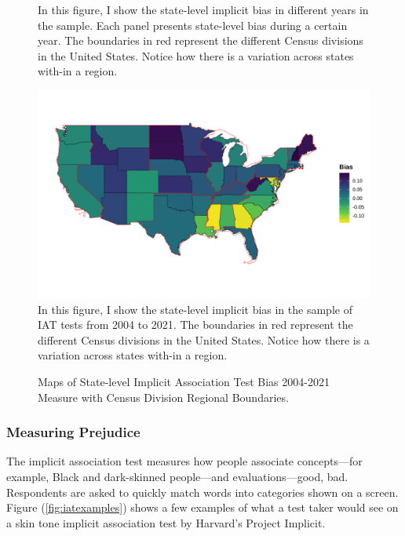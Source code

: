 \documentclass[12pt, fullpage]{article}
\newcommand{\note}[1]{\flushleft\footnotesize{#1}}
\begin{document}
\begin{center}
\begin{figure}[H]
\begin{subfigure}{.3\textwidth}
\label{fig:skiniat-map-2018}
\hfill%
\end{subfigure}
\flushleft\footnotesize{\note{In this figure, I show the state-level implicit bias in different years in the sample. Each panel presents state-level bias during a certain year. The boundaries in red represent the different Census divisions in the United States. Notice how there is a variation across states with-in a region.}}
\end{figure}
\end{center}



\newpage
\pagebreak

\begin{center}
\begin{figure}[H]
\caption{Maps of State-level Implicit Association Test Bias 2004-2021 Measure with Census Division Regional Boundaries.}
\includegraphics[width=\textwidth]{figure/skinmap_all.png} 
\label{fig:iat-map-all}
\flushleft\footnotesize{\note{In this figure, I show the state-level implicit bias in the sample of IAT tests from 2004 to 2021. The boundaries in red represent the different Census divisions in the United States. Notice how there is a variation across states with-in a region.}}
\end{figure}
\end{center}

\subsubsection{Measuring Prejudice}

The implicit association test measures how people associate concepts---for example, Black and dark-skinned people---and evaluations---good, bad. Respondents are asked to quickly match words into categories shown on a screen. Figure (\ref{fig:iatexamples}) shows a few examples of what a test taker would see on a skin tone implicit association test by Harvard's Project Implicit.
\end{document}
